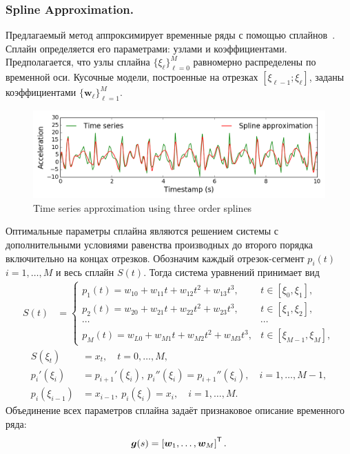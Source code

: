 \documentclass{llncs}
\newcommand{\T}{{\mbox{\scriptsize\sffamily\upshape\mdseries T}}}
\begin{document}
\subsubsection{Spline Approximation.}
Предлагаемый метод аппроксимирует временные ряды с помощью сплайнов~\cite{deboor1978splines}. Сплайн определяется его параметрами: узлами и коэффициентами.
Предполагается, что узлы сплайна $\{\xi_\ell\}_{\ell=0}^M$ равномерно распределены по временной оси.
Кусочные модели, построенные на отрезках $[\xi_{\ell-1}; \xi_{\ell}]$, заданы коэффициентами $\{\mathbf{w}_\ell\}_{\ell=1}^{M}$.
\begin{figure}[h]
	\centering
	\includegraphics[width=1\linewidth]{pics/spline_example.png}
	\caption{Time series approximation using three order splines}
	\label{fig::spline_example}
\end{figure}
Оптимальные параметры сплайна являются решением системы с дополнительными условиями равенства производных до второго порядка включительно на концах отрезков.
Обозначим каждый отрезок-сегмент $p_i(t)$ $i = 1, \dots, M$ и весь сплайн $S(t)$. Тогда система уравнений принимает вид
\begin{align*}
S(t) &= \begin{cases}
p_1(t) = w_{10} +w_{11}t + w_{12}t^2 + w_{13}t^3, & t\in [\xi_0, \xi_1],\\
p_2(t) = w_{20} +w_{21}t + w_{22}t^2 + w_{23}t^3, & t\in [\xi_1, \xi_2],\\
\cdots&\cdots \\
p_{M}(t) = w_{L0} +w_{M1}t + w_{M2}t^2 + w_{M3}t^3, & t\in [\xi_{M-1}, \xi_M],					
\end{cases}
\end{align*}
\begin{align*}
S(\xi_t) &= x_t, \quad t = 0, \dots, M,\\
p_i'(\xi_i) &= p_{i+1}'(\xi_i),\: p_i''(\xi_i) = p_{i+1}''(\xi_i), \quad i = 1, \dots, M-1,\\
p_i(\xi_{i-1}) &= x_{i-1},\: p_i(\xi_i) = x_i, \quad i = 1, \dots, M.
\end{align*}
Объединение всех параметров сплайна задаёт признаковое описание временного ряда:
\[
\bm{g}(s) = \left[\bm{w}_1, \dots, \bm{w}_{M}\right]^{\T}.
\]
\end{document}
